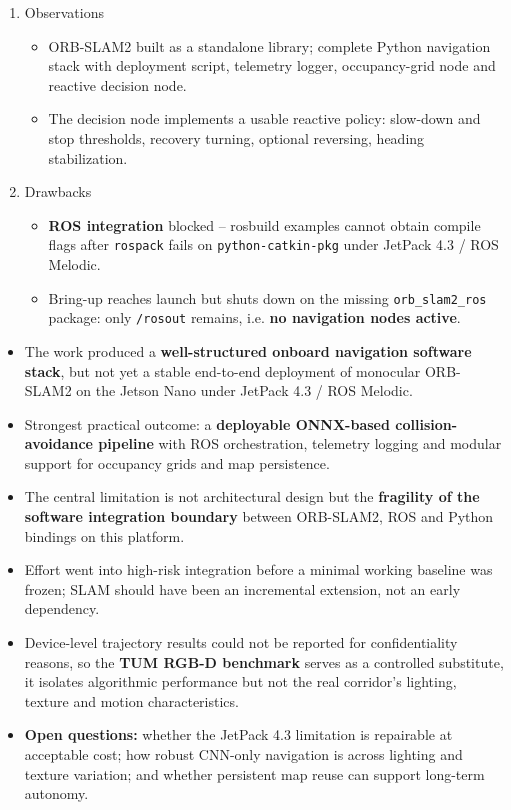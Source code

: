 {
	\begin{enumerate}
	\item Observations
	\begin{itemize}
		\item ORB-SLAM2 built as a standalone library; complete Python navigation stack with deployment script, telemetry logger, occupancy-grid node and reactive decision node.
		\item The decision node implements a usable reactive policy: slow-down and stop thresholds, recovery turning, optional reversing, heading stabilization.
	\end{itemize}
	\item Drawbacks
	\begin{itemize}
		\item \textbf{ROS integration} blocked -- rosbuild examples cannot obtain compile flags after \texttt{rospack} fails on \texttt{python-catkin-pkg} under JetPack 4.3 / ROS Melodic.
		
		\item Bring-up reaches launch but shuts down on the missing \texttt{orb\_slam2\_ros} package: only \texttt{/rosout} remains, i.e. \textbf{no navigation nodes active}.
	\end{itemize}
	\end{enumerate}
}
{
	\begin{itemize}
		\item The work produced a \textbf{well-structured onboard navigation software stack}, but not yet a stable end-to-end deployment of monocular ORB-SLAM2 on the Jetson Nano under JetPack 4.3 / ROS Melodic.
		\item Strongest practical outcome: a \textbf{deployable ONNX-based collision-avoidance pipeline} with ROS orchestration, telemetry logging and modular support for occupancy grids and map persistence.
		\item The central limitation is not architectural design but the \textbf{fragility of the software integration boundary} between ORB-SLAM2, ROS and Python bindings on this platform.
	\end{itemize}
}
	{
		\begin{itemize}
			\item Effort went into high-risk integration before a minimal working baseline was frozen; SLAM should have been an incremental extension, not an early dependency.
			\item Device-level trajectory results could not be reported for confidentiality reasons, so the \textbf{TUM RGB-D benchmark} serves as a controlled substitute, it isolates algorithmic performance but not the real corridor's lighting, texture and motion characteristics.
			\item \textbf{Open questions:} whether the JetPack 4.3 limitation is repairable at acceptable cost; how robust CNN-only navigation is across lighting and texture variation; and whether persistent map reuse can support long-term autonomy.
		\end{itemize}
	}

